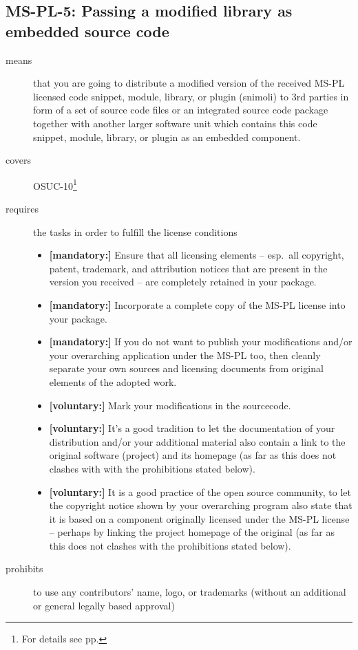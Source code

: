 \subsection{MS-PL-5: Passing a modified library as embedded source code}
\label{OSUC-10-MS-PL}
\begin{description}
\item[means] that you are going to distribute a modified version of the received
MS-PL licensed code snippet, module, library, or plugin (snimoli) to 3rd parties
in form of a set of source code files or an integrated source code package
together with another larger software unit which contains this code snippet,
module, library, or plugin as an embedded component.

\item[covers] OSUC-10\footnote{For details see pp. \pageref{OSUC-10-DEF}}
\item[requires] the tasks in order to fulfill the license conditions
\begin{itemize}
 
 \item \textbf{[mandatory:]} Ensure that all licensing elements -- esp.\ all
  copyright, patent, trademark, and attribution notices that are present in the
  version you received -- are completely retained in your package.
 
  \item \textbf{[mandatory:]} Incorporate a complete copy of the MS-PL license
  into your package.
  
  \item \textbf{[mandatory:]} If you do not want to publish your modifications
  and/or your overarching application under the MS-PL too, then cleanly separate
  your own sources and licensing documents from original elements of the adopted
  work.
  
  \item \textbf{[voluntary:]} Mark your modifications in the sourcecode.
  
  \item \textbf{[voluntary:]} It's a good tradition to let the documentation of
  your distribution and/or your additional material also contain a link to the
  original software (project) and its homepage (as far as this does not clashes
  with with the prohibitions stated below).

  \item \textbf{[voluntary:]} It is a good practice of the open source
  community, to let the copyright notice shown by your overarching program also
  state that it is based on a component originally licensed under the MS-PL
  license -- perhaps by linking the project homepage of the original (as far as
  this does not clashes with the prohibitions stated below).
  
\end{itemize}

\item[prohibits] to use any contributors' name, logo, or trademarks (without an
additional or general legally based approval)

\end{description}

